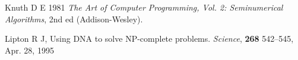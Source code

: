 \documentclass{article}
\begin{document}
\begin{thebibliography}{12}
% 
% 

Knuth D E 1981
{\em The Art of Computer Programming, Vol. 2: Seminumerical Algorithms},
2nd ed (Addison-Wesley).

% 
% 
% 
% 
% 
% 
% 
% 
% 
% 
% 
% 
% 
% 
% 
% 
% 
% 
% 

Lipton R J, 
Using DNA to solve NP-complete problems. 
{\em Science}, {\bf 268} 542--545, Apr. 28, 1995

% 
% 


\end{thebibliography}
\end{document}
